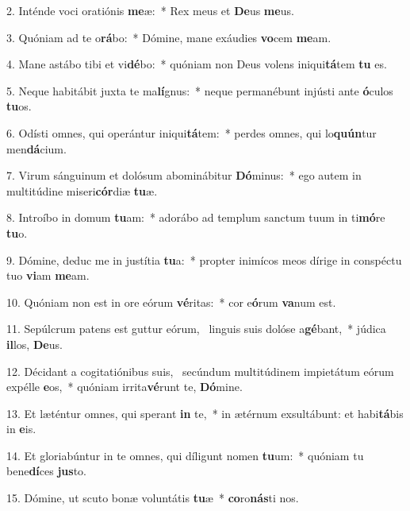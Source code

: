 2. Inténde voci oratiónis \textbf{me}æ:~*  Rex meus et \textbf{De}us \textbf{me}us.\

3. Quóniam ad te o\textbf{rá}bo:~*  Dómine, mane exáudies \textbf{vo}cem \textbf{me}am.\

4. Mane astábo tibi et vi\textbf{dé}bo:~*  quóniam non Deus volens iniqui\textbf{tá}tem \textbf{tu} es.\

5. Neque habitábit juxta te ma\textbf{lí}gnus:~*  neque permanébunt injústi ante \textbf{ó}culos \textbf{tu}os.\

6. Odísti omnes, qui operántur iniqui\textbf{tá}tem:~*  perdes omnes, qui lo\textbf{quún}tur men\textbf{dá}cium.\

7. Virum sánguinum et dolósum abominábitur \textbf{Dó}minus:~*  ego autem in multitúdine miseri\textbf{cór}diæ \textbf{tu}æ.\

8. Introíbo in domum \textbf{tu}am:~*  adorábo ad templum sanctum tuum in ti\textbf{mó}re \textbf{tu}o.\

9. Dómine, deduc me in justítia \textbf{tu}a:~*  propter inimícos meos dírige in conspéctu tuo \textbf{vi}am \textbf{me}am.\

10. Quóniam non est in ore eórum \textbf{vé}ritas:~*  cor e\textbf{ó}rum \textbf{va}num est.\

11. Sepúlcrum patens est guttur eórum, \dag\  linguis suis dolóse a\textbf{gé}bant,~*  júdica \textbf{il}los, \textbf{De}us.\

12. Décidant a cogitatiónibus suis, \dag\  secúndum multitúdinem impietátum eórum expélle \textbf{e}os,~*  quóniam irrita\textbf{vé}runt te, \textbf{Dó}mine.\

13. Et læténtur omnes, qui sperant \textbf{in} te,~*  in ætérnum exsultábunt: et habi\textbf{tá}bis in \textbf{e}is.\

14. Et gloriabúntur in te omnes, qui díligunt nomen \textbf{tu}um:~*  quóniam tu bene\textbf{dí}ces \textbf{jus}to.\

15. Dómine, ut scuto bonæ voluntátis \textbf{tu}æ~*  \textbf{co}ro\textbf{nás}ti nos.\

